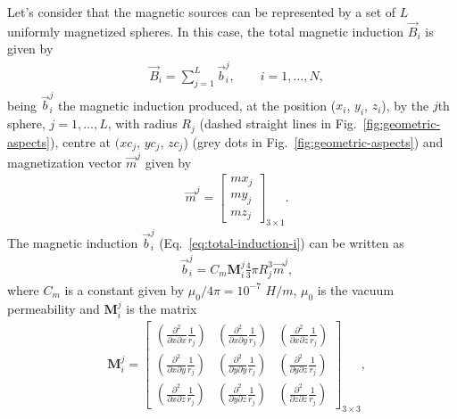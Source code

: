 \documentclass[journal abbreviation, npg]{copernicus}
\begin{document}
Let's consider that the magnetic sources can be represented by a set
of $L$ uniformly magnetized spheres. In this case, the total magnetic
induction $\vec{B}_i$ is given by
\begin{align}
 &
\vec{B}_i = \sum_{j = 1}^{L} \vec{b}_{i}^{j} , \qquad i = 1, \ldots, N ,
\label{eq:total-induction-i}
\end{align}
being $\vec{b}^{j}_{i}$ the magnetic induction produced, at the position
($x_{i}$, $y_{i}$, $z_{i}$), by the $j$th sphere, $j = 1, \ldots, L$, with
radius $R_ {j}$ (dashed straight lines in Fig.~\ref{fig:geometric-aspects}),
centre at $(xc_{j}$, $yc_{j}$, $zc_{j}$) (grey dots in
Fig.~\ref{fig:geometric-aspects}) and magnetization vector $\vec{m}^{j}$
given by
\begin{align}
 &
\vec{m}^{j} =
\begin{bmatrix}
mx_{j} \\
my_{j} \\
mz_{j}
\end{bmatrix}_ {3 \times 1} .
\label{eq:mag-vector-j}
\end{align}
The magnetic induction $\vec{b}^{j}_{i}$ (Eq.~\ref{eq:total-induction-i}) can
be written as
\begin{align}
 &
\vec{b}^{j}_{i} = C_{m}  \mathbf{M}_{i}^{j}
                  \frac{4}{3} \pi R_{j}^{3}
                  \vec{m}^{j} ,
\label{eq:j-induction-i}
\end{align}
where $C_{m}$ is a constant given by $\mu_{0}/{4 \pi}=10^{-7}$ $H/m$,
$\mu_{0}$ is the vacuum permeability and $\mathbf{M}_{i}^{j}$ is the
matrix
\begin{align}
 &
\mathbf{M}^{j}_{i} =
\begin{bmatrix}
\left(\frac{\partial^{2}}{\partial x \partial x} \frac{1}{r_{j}} \right) &
\left(\frac{\partial^{2}}{\partial x \partial y} \frac{1}{r_{j}} \right) &
\left(\frac{\partial^{2}}{\partial x \partial z} \frac{1}{r_{j}} \right) \\[2mm]
\left(\frac{\partial^{2}}{\partial x \partial y} \frac{1}{r_{j}} \right) &
\left(\frac{\partial^{2}}{\partial y \partial y} \frac{1}{r_{j}} \right) &
\left(\frac{\partial^{2}}{\partial y \partial z} \frac{1}{r_{j}} \right) \\[2mm]
\left(\frac{\partial^{2}}{\partial x \partial z} \frac{1}{r_{j}} \right) &
\left(\frac{\partial^{2}}{\partial y \partial z} \frac{1}{r_{j}} \right) &
\left(\frac{\partial^{2}}{\partial z \partial z} \frac{1}{r_{j}} \right)
\end{bmatrix}_{3 \times 3} ,
\label{eq:matrix-Mij}
\end{align}
\end{document}
